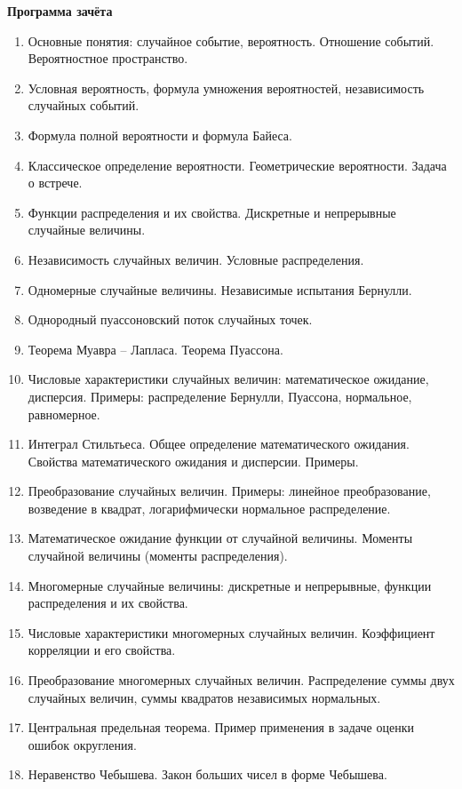 \documentclass[12pt,a4paper]{article}
\begin{document}
    {
        \centering
        \textbf{Программа зачёта}
        \par
    }

    \begin{enumerate}
        \item Основные понятия: случайное событие, вероятность. Отношение событий. Вероятностное пространство.
        \item Условная вероятность, формула умножения вероятностей, независимость случайных событий.
        \item Формула полной вероятности и формула Байеса.
        \item Классическое определение вероятности. Геометрические вероятности. Задача о встрече.
        \item Функции распределения и их свойства. Дискретные и непрерывные случайные величины.
        \item Независимость случайных величин. Условные распределения.
        \item Одномерные случайные величины. Независимые испытания Бернулли.
        \item Однородный пуассоновский поток случайных точек.
        \item Теорема Муавра -- Лапласа. Теорема Пуассона.
        \item Числовые характеристики случайных величин: математическое ожидание, дисперсия. Примеры: распределение Бернулли, Пуассона, нормальное, равномерное.
        \item Интеграл Стильтьеса. Общее определение математического ожидания. Свойства математического ожидания и дисперсии. Примеры.
        \item Преобразование случайных величин. Примеры: линейное преобразование, возведение в квадрат, логарифмически нормальное распределение.
        \item Математическое ожидание функции от случайной величины. Моменты случайной величины (моменты распределения).
        \item Многомерные случайные величины: дискретные и непрерывные, функции распределения и их свойства.
        \item Числовые характеристики многомерных случайных величин. Коэффициент корреляции и его свойства.
        \item Преобразование многомерных случайных величин. Распределение суммы двух случайных величин, суммы квадратов независимых нормальных.
        \item Центральная предельная теорема. Пример применения в задаче оценки ошибок округления.
        \item Неравенство Чебышева. Закон больших чисел в форме Чебышева.
    \end{enumerate}
\end{document}
